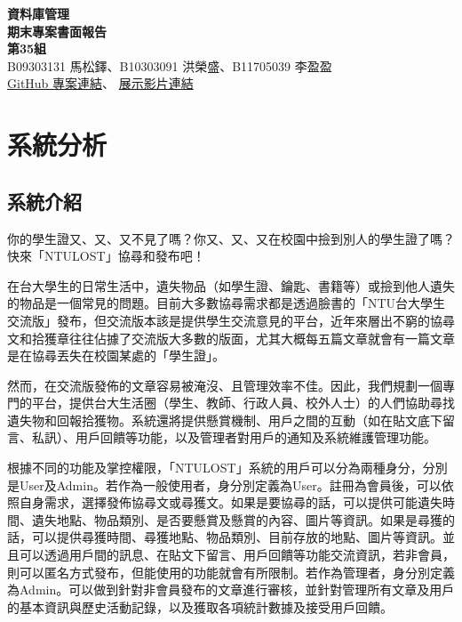 \documentclass[12pt,a4paper]{article}
\begin{document}
\title{}
\author{}
\date{}

\begin{center}
\textbf{\Large 資料庫管理\\
期末專案書面報告 \\[.5cm]
第35組 } \\[10pt]
B09303131 馬松鐸、B10303091 洪榮盛、B11705039 李盈盈\\[10pt]
\href{https://github.com/felixhungsv/2024_DB.git}{GitHub 專案連結}、 \href{https://youtu.be/YG6_KMKiZ4s}{展示影片連結}\\
\end{center}


\section{系統分析}

\subsection{系統介紹}

你的學生證又、又、又不見了嗎？你又、又、又在校園中撿到別人的學生證了嗎？快來「NTULOST」協尋和發布吧！

在台大學生的日常生活中，遺失物品（如學生證、鑰匙、書籍等）或撿到他人遺失的物品是一個常見的問題。目前大多數協尋需求都是透過臉書的「NTU台大學生交流版」發布，但交流版本該是提供學生交流意見的平台，近年來層出不窮的協尋文和拾獲章往往佔據了交流版大多數的版面，尤其大概每五篇文章就會有一篇文章是在協尋丟失在校園某處的「學生證」。

然而，在交流版發佈的文章容易被淹沒、且管理效率不佳。因此，我們規劃一個專門的平台，提供台大生活圈（學生、教師、行政人員、校外人士）的人們協助尋找遺失物和回報拾獲物。系統還將提供懸賞機制、用戶之間的互動（如在貼文底下留言、私訊）、用戶回饋等功能，以及管理者對用戶的通知及系統維護管理功能。

根據不同的功能及掌控權限，「NTULOST」系統的用戶可以分為兩種身分，分別是User及Admin。若作為一般使用者，身分別定義為User。註冊為會員後，可以依照自身需求，選擇發佈協尋文或尋獲文。如果是要協尋的話，可以提供可能遺失時間、遺失地點、物品類別、是否要懸賞及懸賞的內容、圖片等資訊。如果是尋獲的話，可以提供尋獲時間、尋獲地點、物品類別、目前存放的地點、圖片等資訊。並且可以透過用戶間的訊息、在貼文下留言、用戶回饋等功能交流資訊，若非會員，則可以匿名方式發布，但能使用的功能就會有所限制。若作為管理者，身分別定義為Admin。可以做到針對非會員發布的文章進行審核，並針對管理所有文章及用戶的基本資訊與歷史活動記錄，以及獲取各項統計數據及接受用戶回饋。
\end{document}
